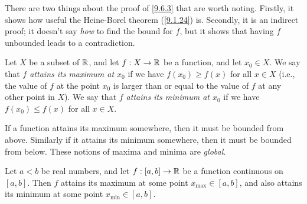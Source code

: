\begin{rmk}\label{9.6.4}
  There are two things about the proof of \cref{9.6.3} that are worth noting.
  Firstly, it shows how useful the Heine-Borel theorem (\cref{9.1.24}) is.
  Secondly, it is an indirect proof;
  it doesn't say \emph{how} to find the bound for \(f\), but it shows that having \(f\) unbounded leads to a contradiction.
\end{rmk}

\begin{defn}\label{9.6.5}
  Let \(X\) be a subset of \(\mathbb{R}\), and let \(f : X \to \mathbb{R}\) be a function, and let \(x_0 \in X\).
  We say that \emph{\(f\) attains its maximum at \(x_0\)} if we have \(f(x_0) \geq f(x)\) for all \(x \in X\)
  (i.e., the value of \(f\) at the point \(x_0\) is larger than or equal to the value of \(f\) at any other point in \(X\)).
  We say that \emph{\(f\) attains its minimum at \(x_0\)} if we have \(f(x_0) \leq f(x)\) for all \(x \in X\).
\end{defn}

\begin{rmk}\label{9.6.6}
  If a function attains its maximum somewhere, then it must be bounded from above.
  Similarly if it attains its minimum somewhere, then it must be bounded from below.
  These notions of maxima and minima are \emph{global}.
\end{rmk}

\begin{prop}\label{9.6.7}
  Let \(a < b\) be real numbers, and let \(f : [a, b] \to \mathbb{R}\) be a function continuous on \([a, b]\).
  Then \(f\) attains its maximum at some point \(x_{\max} \in [a, b]\), and also attains its minimum at some point \(x_{\min} \in [a, b]\).
\end{prop}

